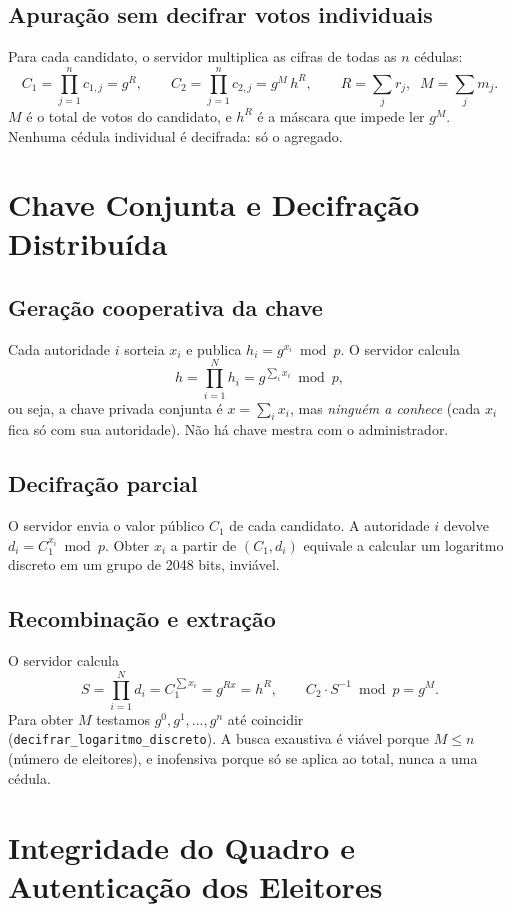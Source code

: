 \documentclass[11pt,a4paper]{article}
\begin{document}
\subsection{Apuração sem decifrar votos individuais}
Para cada candidato, o servidor multiplica as cifras de todas as $n$ cédulas:
\[
C_1=\prod_{j=1}^{n}c_{1,j}=g^{R},\qquad
C_2=\prod_{j=1}^{n}c_{2,j}=g^{M}\,h^{R},\qquad R=\sum_j r_j,\;\; M=\sum_j m_j .
\]
$M$ é o total de votos do candidato, e $h^R$ é a máscara que impede ler $g^M$. Nenhuma cédula individual é decifrada: só o agregado.

\section{Chave Conjunta e Decifração Distribuída}
\subsection{Geração cooperativa da chave}
Cada autoridade $i$ sorteia $x_i$ e publica $h_i=g^{x_i}\bmod p$. O servidor calcula
\[
h=\prod_{i=1}^{N}h_i=g^{\sum_i x_i}\bmod p ,
\]
ou seja, a chave privada conjunta é $x=\sum_i x_i$, mas \emph{ninguém a conhece} (cada $x_i$ fica só com sua autoridade). Não há chave mestra com o administrador.

\subsection{Decifração parcial}
O servidor envia o valor público $C_1$ de cada candidato. A autoridade $i$ devolve $d_i=C_1^{x_i}\bmod p$. Obter $x_i$ a partir de $(C_1,d_i)$ equivale a calcular um logaritmo discreto em um grupo de 2048 bits, inviável.

\subsection{Recombinação e extração}
O servidor calcula
\[
S=\prod_{i=1}^{N}d_i=C_1^{\sum x_i}=g^{R x}=h^{R},\qquad
C_2\cdot S^{-1}\bmod p=g^{M}.
\]
Para obter $M$ testamos $g^0,g^1,\dots,g^n$ até coincidir (\texttt{decifrar\_logaritmo\_discreto}). A busca exaustiva é viável porque $M\le n$ (número de eleitores), e inofensiva porque só se aplica ao total, nunca a uma cédula.

\section{Integridade do Quadro e Autenticação dos Eleitores}
\end{document}

